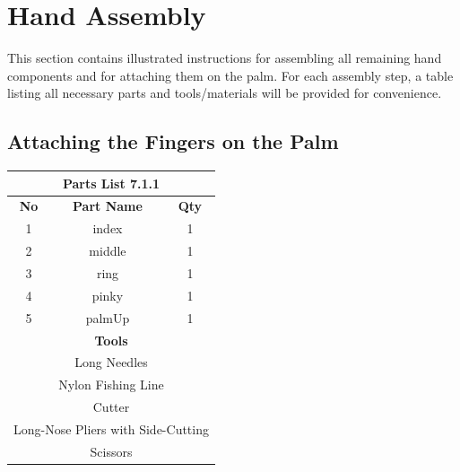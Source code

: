 \section{Hand Assembly}

This section contains illustrated instructions for assembling all remaining hand components and for attaching them on the palm. For each assembly step, a table listing all necessary parts and tools/materials will be provided for convenience.

\subsection{Attaching the Fingers on the Palm}


\begin{table}[ht!]
	\centering
	\begin{tabular}{ | c | c | c |}
		\hline
		\multicolumn{3}{|c|}{{\textbf{Parts List 7.1.1}}} \\ \hline		
		{\bf{No}} & {\bf{Part Name}} & {\bf{Qty}}\\ \hline
    		1 & index & 1  \\ \hline
    		2 & middle & 1  \\ \hline
		3 & ring & 1 \\ \hline
		4 & pinky & 1 \\ \hline
		5 & palmUp & 1 \\ \hline
		\multicolumn{3}{|c|}{{\textbf{Tools}}} \\ \hline
		\multicolumn{3}{|c|}{{{Long Needles}}} \\ \hline
		\multicolumn{3}{|c|}{{{Nylon Fishing Line}}} \\ \hline
		\multicolumn{3}{|c|}{{{Cutter}}} \\ \hline
		\multicolumn{3}{|c|}{{{Long-Nose Pliers with Side-Cutting}}} \\ \hline
		\multicolumn{3}{|c|}{{{Scissors}}} \\ \hline
		
    	\end{tabular}
\end{table}

\vspace{0.5cm}

